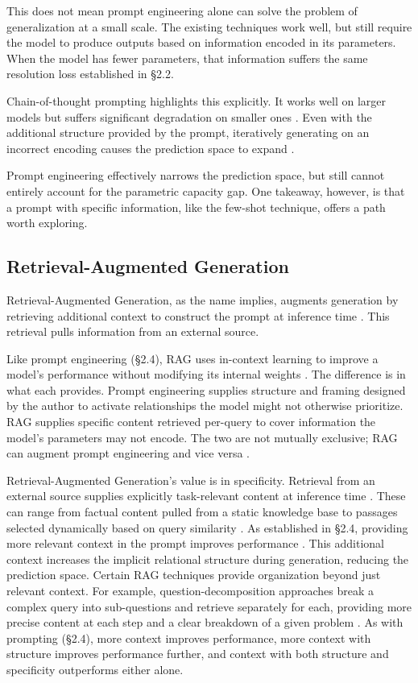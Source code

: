 \documentclass{article}
\begin{document}
This does not mean prompt engineering alone can solve the problem of generalization at a small scale. The existing techniques work well, but still require the model to produce outputs based on information encoded in its parameters. When the model has fewer parameters, that information suffers the same resolution loss established in \S2.2.

Chain-of-thought prompting highlights this explicitly. It works well on larger models \cite{wei2022cot} but suffers significant degradation on smaller ones \cite{cot_degradation_slm2025, smallmodel_learnability2025}. Even with the additional structure provided by the prompt, iteratively generating on an incorrect encoding causes the prediction space to expand \cite{exposure_bias_ilp2022, lpsr2026}.

Prompt engineering effectively narrows the prediction space, but still cannot entirely account for the parametric capacity gap. One takeaway, however, is that a prompt with specific information, like the few-shot technique, offers a path worth exploring.


\subsection{Retrieval-Augmented Generation}


Retrieval-Augmented Generation, as the name implies, augments generation by retrieving additional context to construct the prompt at inference time \cite{lewis2020rag, rag_survey2023}. This retrieval pulls information from an external source.

Like prompt engineering (\S2.4), RAG uses in-context learning to improve a model's performance without modifying its internal weights \cite{lewis2020rag}. The difference is in what each provides. Prompt engineering supplies structure and framing designed by the author to activate relationships the model might not otherwise prioritize. RAG supplies specific content retrieved per-query to cover information the model's parameters may not encode. The two are not mutually exclusive; RAG can augment prompt engineering and vice versa \cite{prompt_eng_rag_slm2026}.

Retrieval-Augmented Generation's value is in specificity. Retrieval from an external source supplies explicitly task-relevant content at inference time \cite{lewis2020rag}. These can range from factual content pulled from a static knowledge base to passages selected dynamically based on query similarity \cite{rag_survey2023}. As established in \S2.4, providing more relevant context in the prompt improves performance \cite{brown2020gpt3}. This additional context increases the implicit relational structure during generation, reducing the prediction space. Certain RAG techniques provide organization beyond just relevant context. For example, question-decomposition approaches break a complex query into sub-questions and retrieve separately for each, providing more precise content at each step and a clear breakdown of a given problem \cite{question_decomp_rag2025}. As with prompting (\S2.4), more context improves performance, more context with structure improves performance further, and context with both structure and specificity outperforms either alone.
\end{document}
